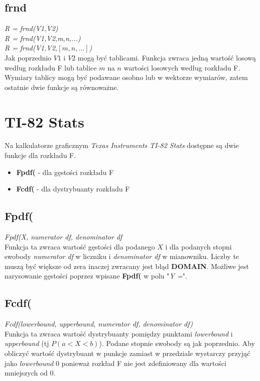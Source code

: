 \documentclass{article}
\begin{document}
{\subsection{frnd}
\textit{R = frnd(V1,V2)} \\
\textit{R = frnd(V1,V2,m,n,...)}\\
\textit{R = frnd(V1,V2,$[m,n,...]$)} \\
Jak poprzednio $V1$ i $V2$ mogą być tablicami. Funkcja zwraca jedną wartość losową według rozkładu F lub tablice $m$ na $n$ wartości losowych według rozkładu F. Wymiary tablicy mogą być podawane osobno lub w wektorze wymiarów, zatem ostatnie dwie funkcje są równoważne.

\newpage
\section{TI-82 Stats}
Na kalkulatorze graficznym \textit{Texas Instruments TI-82 Stats} dostępne są dwie funkcje dla rozkładu F.
\begin{itemize}
\item \textbf{Fpdf(} - dla gęstości rozkładu F
\item \textbf{Fcdf(} - dla dystrybuanty rozkładu F
\end{itemize}
\subsection{Fpdf(}
\textit{Fpdf(X, numerator df, denominator df} \\
Funkcja ta zwraca wartość gęstości dla podanego $X$ i dla podanych stopni swobody \textit{numerator df} w liczniku i \textit{denominator df} w mianowniku. Liczby te muszą być większe od zera inaczej zwracany jest błąd \textbf{DOMAIN}. Możliwe jest narysowanie gęstości poprzez wpisane \textbf{Fpdf(} w polu "\textit{Y =}".

\subsection{Fcdf(}
\textit{Fcdf(lowerbound, upperbound, numerator df, denominator df)} \\
Funkcja ta zwraca wartość dystrybuanty pomiędzy punktami \textit{lowerbound} i \textit{upperbound} (tj $P(a<X<b)$). Podane stopnie swobody są jak poprzednio. Aby obliczyć wartość dystrybuant w punkcje zamiast w przedziale wystarczy przyjąć jako \textit{lowerbound} 0 ponieważ rozkład F nie jest zdefiniowany dla wartości mniejszych od 0.

\newpage
}
\end{document}
